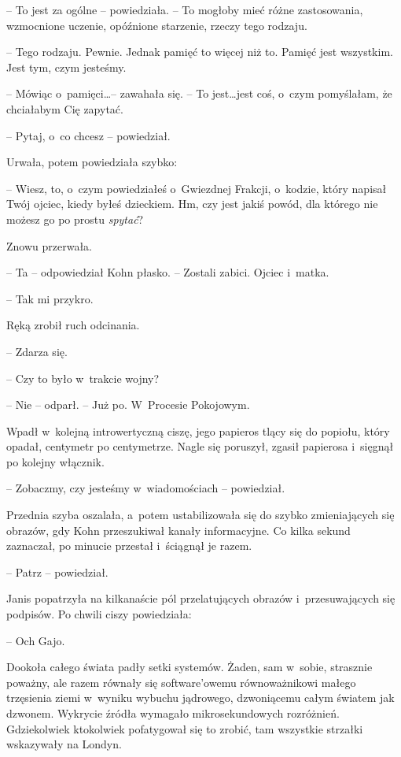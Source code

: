 \documentclass[oneside,polish,11pt,sfheadings]{mwbk}
\begin{document}
-- To jest za ogólne -- powiedziała. -- To mogłoby mieć różne zastosowania,
wzmocnione uczenie, opóźnione starzenie, rzeczy tego rodzaju.

-- Tego rodzaju. Pewnie. Jednak pamięć to więcej niż to. Pamięć jest
wszystkim. Jest tym, czym jesteśmy.

-- Mówiąc o~pamięci\ldots -- zawahała się. -- To jest\ldots jest coś, o~czym
pomyślałam, że chciałabym Cię zapytać.

-- Pytaj, o~co chcesz -- powiedział.

Urwała, potem powiedziała szybko: 

-- Wiesz, to, o~czym powiedziałeś o~Gwiezdnej Frakcji, o~kodzie, który napisał Twój ojciec, kiedy byłeś
dzieckiem. Hm, czy jest jakiś powód, dla którego nie możesz go po prostu
\emph{spytać}?

Znowu przerwała.

-- Ta -- odpowiedział Kohn płasko. -- Zostali zabici. Ojciec i~matka.

-- Tak mi przykro.

Ręką zrobił ruch odcinania. 

-- Zdarza się.

-- Czy to było w~trakcie wojny?

-- Nie -- odparł. -- Już po. W~Procesie Pokojowym.

Wpadł w~kolejną introwertyczną ciszę, jego papieros tlący się do
popiołu, który opadał, centymetr po centymetrze. Nagle się poruszył,
zgasił papierosa i~sięgnął po kolejny włącznik.

-- Zobaczmy, czy jesteśmy w~wiadomościach -- powiedział.

Przednia szyba oszalała, a~potem ustabilizowała się do szybko
zmieniających się obrazów, gdy Kohn przeszukiwał kanały informacyjne. Co
kilka sekund zaznaczał, po minucie przestał i~ściągnął je razem.

-- Patrz -- powiedział.

Janis popatrzyła na kilkanaście pól przelatujących obrazów i~przesuwających się podpisów. Po chwili ciszy powiedziała: 

-- Och Gajo.

Dookoła całego świata padły setki systemów. Żaden, sam w~sobie,
strasznie poważny, ale razem równały się software'owemu równoważnikowi
małego trzęsienia ziemi w~wyniku wybuchu jądrowego, dzwoniącemu całym
światem jak dzwonem. Wykrycie źródła wymagało mikrosekundowych
rozróżnień. Gdziekolwiek ktokolwiek pofatygował się to zrobić, tam
wszystkie strzałki wskazywały na Londyn.
\end{document}
